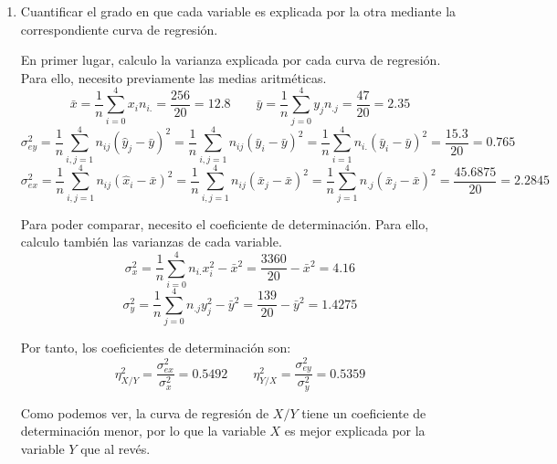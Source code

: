 \begin{ejercicio}
\begin{enumerate}
        \item Cuantificar el grado en que cada variable es explicada por la otra mediante la correspondiente curva de regresión.

        En primer lugar, calculo la varianza explicada por cada curva de regresión. Para ello, necesito previamente las medias aritméticas.
        \begin{equation*}
            \bar{x} = \frac{1}{n} \sum_{i=0}^4x_i n_{i.} = \frac{256}{20} = 12.8
            \qquad
            \bar{y} = \frac{1}{n} \sum_{j=0}^4 y_j n_{.j} = \frac{47}{20} = 2.35
        \end{equation*}
        \begin{equation*}
            \sigma_{ey}^2 = \frac{1}{n}\sum_{i,j=1}^4 n_{ij}(\hat{y}_j-\bar{y})^2
            = \frac{1}{n}\sum_{i,j=1}^4 n_{ij}(\bar{y}_i-\bar{y})^2 
            = \frac{1}{n}\sum_{i=1}^4 n_{i.}(\bar{y}_i-\bar{y})^2 =\frac{15.3}{20} = 0.765
        \end{equation*}
        \begin{equation*}
            \sigma_{ex}^2 = \frac{1}{n}\sum_{i,j=1}^4 n_{ij}(\hat{x}_i-\bar{x})^2
            = \frac{1}{n}\sum_{i,j=1}^4 n_{ij}(\bar{x}_j-\bar{x})^2 
            = \frac{1}{n}\sum_{j=1}^4 n_{.j}(\bar{x}_j-\bar{x})^2 =\frac{45.6875}{20} = 2.2845
        \end{equation*}

        Para poder comparar, necesito el coeficiente de determinación. Para ello, calculo también las varianzas de cada variable.
        \begin{equation*}
            \sigma_x^2 = \frac{1}{n}\sum_{i=0}^4 n_{i.}x_i^2 - \bar{x}^2 = \frac{3360}{20} - \bar{x}^2 = 4.16
        \end{equation*}
        \begin{equation*}
            \sigma_y^2 = \frac{1}{n}\sum_{j=0}^4 n_{.j}y_j^2 - \bar{y}^2 = \frac{139}{20} - \bar{y}^2 = 1.4275
        \end{equation*}

        Por tanto, los coeficientes de determinación son:
        \begin{equation*}
            \eta_{X/Y}^2 = \frac{\sigma_{ex}^2}{\sigma_x^2} = 0.5492
            \qquad
            \eta_{Y/X}^2 = \frac{\sigma_{ey}^2}{\sigma_y^2} = 0.5359
        \end{equation*}

        Como podemos ver, la curva de regresión de $X/Y$ tiene un coeficiente de determinación menor, por lo que la variable $X$ es mejor explicada por la variable $Y$ que al revés.


\end{enumerate}
\end{ejercicio}
